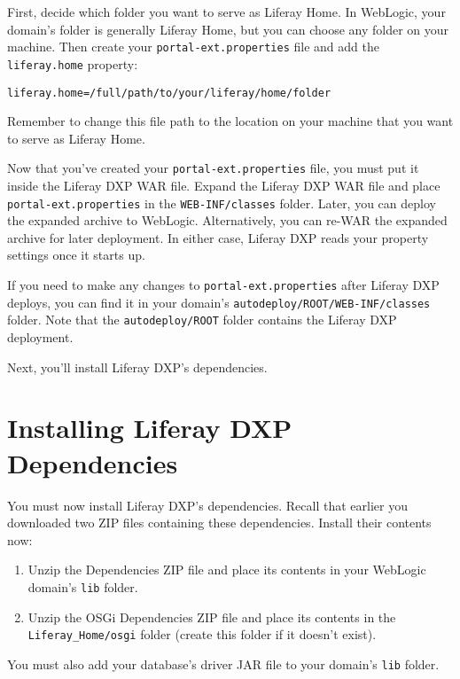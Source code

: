 First, decide which folder you want to serve as Liferay Home. In
WebLogic, your domain's folder is generally Liferay Home, but you can
choose any folder on your machine. Then create your
\texttt{portal-ext.properties} file and add the \texttt{liferay.home}
property:

\begin{verbatim}
liferay.home=/full/path/to/your/liferay/home/folder
\end{verbatim}

Remember to change this file path to the location on your machine that
you want to serve as Liferay Home.

Now that you've created your \texttt{portal-ext.properties} file, you
must put it inside the Liferay DXP WAR file. Expand the Liferay DXP WAR
file and place \texttt{portal-ext.properties} in the
\texttt{WEB-INF/classes} folder. Later, you can deploy the expanded
archive to WebLogic. Alternatively, you can re-WAR the expanded archive
for later deployment. In either case, Liferay DXP reads your property
settings once it starts up.

If you need to make any changes to \texttt{portal-ext.properties} after
Liferay DXP deploys, you can find it in your domain's
\texttt{autodeploy/ROOT/WEB-INF/classes} folder. Note that the
\texttt{autodeploy/ROOT} folder contains the Liferay DXP deployment.

Next, you'll install Liferay DXP's dependencies.

\section{Installing Liferay DXP
Dependencies}\label{installing-liferay-dxp-dependencies}

You must now install Liferay DXP's dependencies. Recall that earlier you
downloaded two ZIP files containing these dependencies. Install their
contents now:

\begin{enumerate}
\def\labelenumi{\arabic{enumi}.}
\item
  Unzip the Dependencies ZIP file and place its contents in your
  WebLogic domain's \texttt{lib} folder.
\item
  Unzip the OSGi Dependencies ZIP file and place its contents in the
  \texttt{Liferay\_Home/osgi} folder (create this folder if it doesn't
  exist).
\end{enumerate}

You must also add your database's driver JAR file to your domain's
\texttt{lib} folder.


